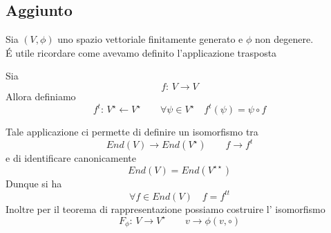 \newpage

\subsection{Aggiunto}

Sia $(V,\phi)$ uno spazio vettoriale finitamente generato e $\phi$ non degenere.\\
\'E utile ricordare come avevamo definito l'applicazione trasposta
\begin{defn}\bianco
Sia 
$$ f:\, V \to V $$ 
Allora definiamo 
$$ f^t:\, V^\star \gets V^\star \qquad \forall \psi \in V^\star \quad f^t ( \psi) = \psi \circ f $$
\end{defn}
Tale applicazione ci permette di definire un isomorfismo tra 
$$ End (V ) \to End(V^\star) \qquad f\to f^t$$
e di identificare canonicamente
$$ End (V) = End \left( V^{\star \star } \right)$$ 
Dunque si ha 
$$ \forall f \in End(V) \quad  f = f^{tt} $$
\hspace{0.1 cm }
Inoltre per il teorema di rappresentazione possiamo costruire l' isomorfismo
$$ F_\phi:\, V \to V^\star \qquad v \to \phi(v, \circ)$$

